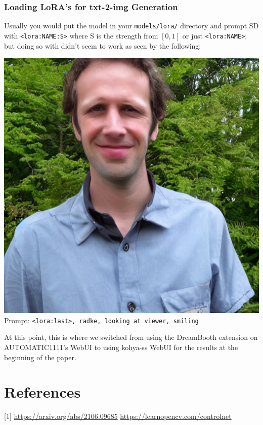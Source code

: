 \documentclass{article}
\begin{document}
\subsubsection{Loading LoRA's for txt-2-img Generation}
Usually you would put the model in your \verb|models/lora/| directory and prompt SD with \verb|<lora:NAME:S>| where S is the strength from $[0, 1]$ or just \verb|<lora:NAME>|; but doing so with didn't seem to work as seen by the following:
\begin{center}
    \includegraphics[scale=0.2]{.imgs/radke_lora_v1.5_(1)_prompting.png} \\
    Prompt: \verb|<lora:last>, radke, looking at viewer, smiling|
\end{center}
At this point, this is where we switched from using the DreamBooth extension on AUTOMATIC1111's WebUI to using kohya-ss WebUI for the results at the beginning of the paper.

\section{References}
[1] \url{https://arxiv.org/abs/2106.09685} \newline
[2] \url{https://learnopencv.com/controlnet} \\
\end{document}
